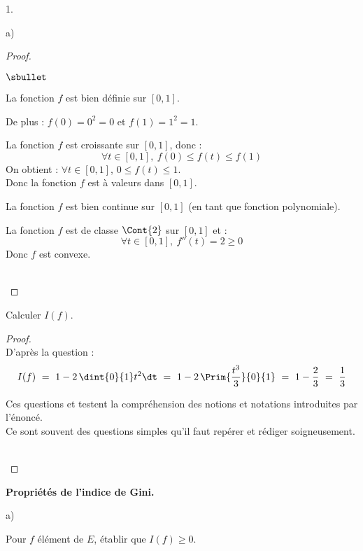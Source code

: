 \begin{noliste}{1.}
\begin{noliste}{a)}
  \begin{proof}~
    \begin{noliste}{$\sbullet$}
      \item La fonction $f$ est bien définie sur $[0,1]$.
      \item De plus : $f(0)=0^2=0$ et $f(1)=1^2=1$.
      \item La fonction $f$ est croissante sur $[0,1]$, donc :
      \[
        \forall t \in [0,1], \ f(0) \leq f(t) \leq f(1)
      \]
      On obtient : $\forall t \in [0,1]$, $0 \leq f(t) \leq 1$.\\
      Donc la fonction $f$ est à valeurs dans $[0,1]$.
      \item La fonction $f$ est bien continue sur $[0,1]$ (en tant 
      que fonction polynomiale).
      \item La fonction $f$ est de classe $\Cont{2}$ sur $[0,1]$ et :
      \[
        \forall t \in [0,1], \ f''(t)=2 \geq 0
      \]
      Donc $f$ est convexe.
    \end{noliste}
    ~\\[-1cm]
  \end{proof}

  
  \item Calculer $I(f)$. 
  
  \begin{proof}~\\
    D'après la question  :
    \[
      I(f) \ = \ 1-2 \, \dint{0}{1} t^2\dt \ = \ 1- 2 \, 
      \Prim{\dfrac{t^3}{3}}
      {0}{1} \ = \ 1-\dfrac{2}{3} \ = \ \dfrac{1}{3}
    \]
    
    \begin{remark}
      Ces questions  et  testent la 
      compréhension des notions et notations introduites par l'énoncé.\\
      Ce sont souvent des questions simples qu'il faut repérer et 
      rédiger soigneusement.
    \end{remark}~\\[-1.4cm]
  \end{proof}
 \end{noliste}
 
 \item \textbf{Propriétés de l'indice de Gini.}
 \begin{noliste}{a)}
  \item Pour $f$ élément de $E$, établir que $I(f) \geq 0$. 
  

\end{noliste}
\end{noliste}
